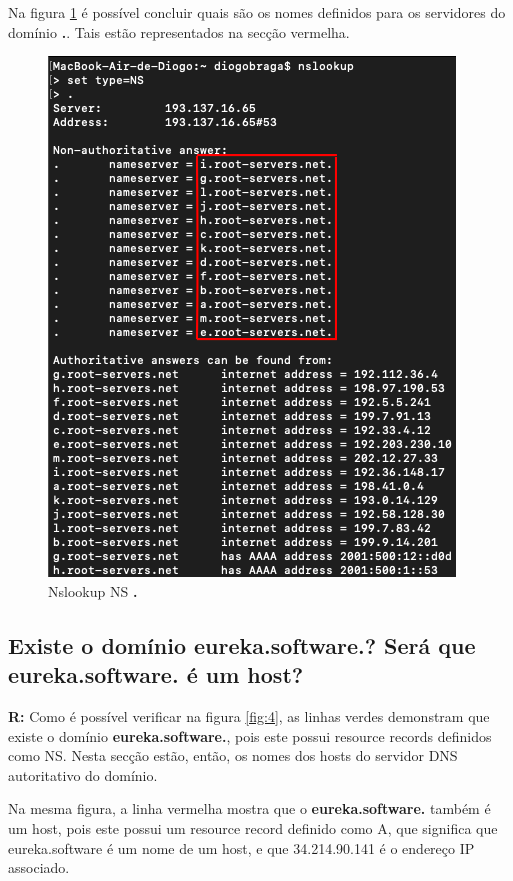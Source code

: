 \documentclass{llncs}
\begin{document}
\newpage

Na figura \ref{fig:33} é possível concluir quais são os nomes definidos para os servidores do domínio \textbf{.}. Tais estão representados na secção vermelha.

\begin{figure}[H]
\begin{center}
\includegraphics[scale=0.6]{3_3.png}
\end{center}
\caption{\label{fig:33}Nslookup NS \textbf{.}}
\end{figure}


\newpage

\subsection{\textbf{Existe o domínio eureka.software.? Será que eureka.software. é um host?}}
\textbf{R:} Como é possível verificar na figura \ref{fig:4}, as linhas verdes demonstram que existe o domínio \textbf{eureka.software.}, pois este possui resource records definidos como NS. Nesta secção estão, então, os nomes dos hosts do servidor DNS autoritativo do domínio.

Na mesma figura, a linha vermelha mostra que o \textbf{eureka.software.} também é um host, pois este possui um resource record definido como A, que significa que eureka.software é um nome de um host, e que 34.214.90.141 é o endereço IP associado.
\end{document}
